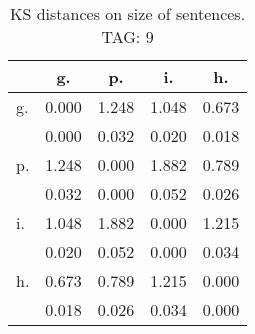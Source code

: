 \begin{table}[h!]
\begin{center}
\begin{tabular}{| l | c | c | c | c |}\hline
 & g. & p. & i. & h. \\\hline
g. & 0.000  & 1.248  & 1.048  & 0.673 \\\hline
 & 0.000  & 0.032  & 0.020  & 0.018 \\\hline
p. & 1.248  & 0.000  & 1.882  & 0.789 \\\hline
 & 0.032  & 0.000  & 0.052  & 0.026 \\\hline
i. & 1.048  & 1.882  & 0.000  & 1.215 \\\hline
 & 0.020  & 0.052  & 0.000  & 0.034 \\\hline
h. & 0.673  & 0.789  & 1.215  & 0.000 \\\hline
 & 0.018  & 0.026  & 0.034  & 0.000 \\\hline
\end{tabular}
\caption{KS distances on size of sentences. TAG: 9}
\end{center}
\end{table}